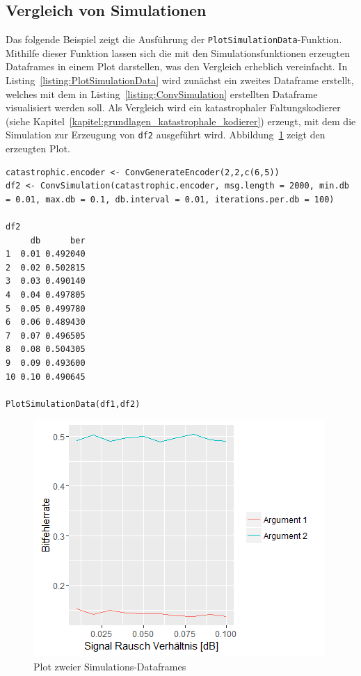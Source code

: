 \subsection{Vergleich von Simulationen}
\label{kapitel:beispiele_simulation_vergleich}
Das folgende Beispiel zeigt die Ausführung der \texttt{PlotSimulationData}-Funktion. Mithilfe dieser Funktion lassen sich die mit den Simulationsfunktionen erzeugten Dataframes in einem Plot darstellen, was den Vergleich erheblich vereinfacht. In Listing~\ref{listing:PlotSimulationData} wird zunächst ein zweites Dataframe erstellt, welches mit dem in Listing~\ref{listing:ConvSimulation} erstellten Dataframe visualisiert werden soll. Als Vergleich wird ein katastrophaler Faltungskodierer (siehe Kapitel~\ref{kapitel:grundlagen_katastrophale_kodierer}) erzeugt, mit dem die Simulation zur Erzeugung von \texttt{df2} ausgeführt wird. Abbildung~\ref{abb:PlotSimulationData} zeigt den erzeugten Plot.
\begin{lstlisting}[caption=Vergleich mehrerer Simulationsdaten, label={listing:PlotSimulationData}, float=!th]
catastrophic.encoder <- ConvGenerateEncoder(2,2,c(6,5))
df2 <- ConvSimulation(catastrophic.encoder, msg.length = 2000, min.db = 0.01, max.db = 0.1, db.interval = 0.01, iterations.per.db = 100)

df2
     db      ber
1  0.01 0.492040
2  0.02 0.502815
3  0.03 0.490140
4  0.04 0.497805
5  0.05 0.499780
6  0.06 0.489430
7  0.07 0.496505
8  0.08 0.504305
9  0.09 0.493600
10 0.10 0.490645

PlotSimulationData(df1,df2)
\end{lstlisting}
\begin{figure}[!ht]
	\centering
	\includegraphics[width=\ScaleIfNeeded]{abbildungen/Rplot_PlotSimulationData}
	\caption{Plot zweier Simulations-Dataframes}
	\label{abb:PlotSimulationData}
\end{figure}